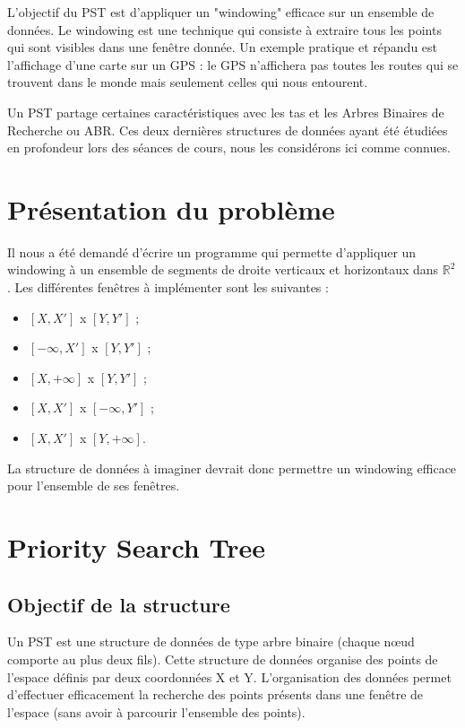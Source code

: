 \documentclass[10pt,a4paper]{article}
\begin{document}
L'objectif du PST est d'appliquer un "windowing" efficace sur un ensemble de données. Le windowing est une technique qui consiste à extraire tous les points qui sont visibles dans une fenêtre donnée. Un exemple pratique et répandu est l'affichage d'une carte sur un GPS : le GPS n'affichera pas toutes les routes qui se trouvent dans le monde mais seulement celles qui nous entourent.

Un PST partage certaines caractéristiques avec les tas et les Arbres Binaires de Recherche ou ABR. Ces deux dernières structures de données ayant été étudiées en profondeur lors des séances de cours, nous les considérons ici comme connues.

\section{Présentation du problème}
Il nous a été demandé d'écrire un programme qui permette d'appliquer un windowing à un ensemble de segments de droite verticaux et horizontaux dans $\mathbb{R}^2$. Les différentes fenêtres à implémenter sont les suivantes :
\begin{itemize}
	\item $[X, X']$ x $[Y, Y']$ ;
	\item $[-\infty, X']$ x $[Y, Y']$ ;
	\item $[X, +\infty]$ x $[Y, Y']$ ;
	\item $[X, X']$ x $[-\infty, Y']$ ;
	\item $[X, X']$ x $[Y, +\infty]$.
\end{itemize}
La structure de données à imaginer devrait donc permettre un windowing efficace pour l'ensemble de ses fenêtres.


\newpage
\section{Priority Search Tree}

\subsection{Objectif de la structure}
Un PST est une structure de données de type arbre binaire (chaque nœud comporte au plus deux fils). Cette structure de données organise des points de l'espace définis par deux coordonnées X et Y. L'organisation des données permet d'effectuer efficacement la recherche des points présents dans une fenêtre de l'espace (sans avoir à parcourir l'ensemble des points).
\end{document}
